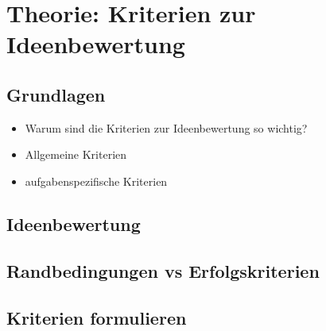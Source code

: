 \section{Theorie: Kriterien zur Ideenbewertung}\label{sec:kaptiel}
\subsection{Grundlagen}
\begin{itemize}
    \item Warum sind die Kriterien zur Ideenbewertung so wichtig?
    \item Allgemeine Kriterien
    \item aufgabenspezifische Kriterien
\end{itemize}
\subsection{Ideenbewertung}

\subsection{Randbedingungen vs Erfolgskriterien}
\subsection{Kriterien formulieren}